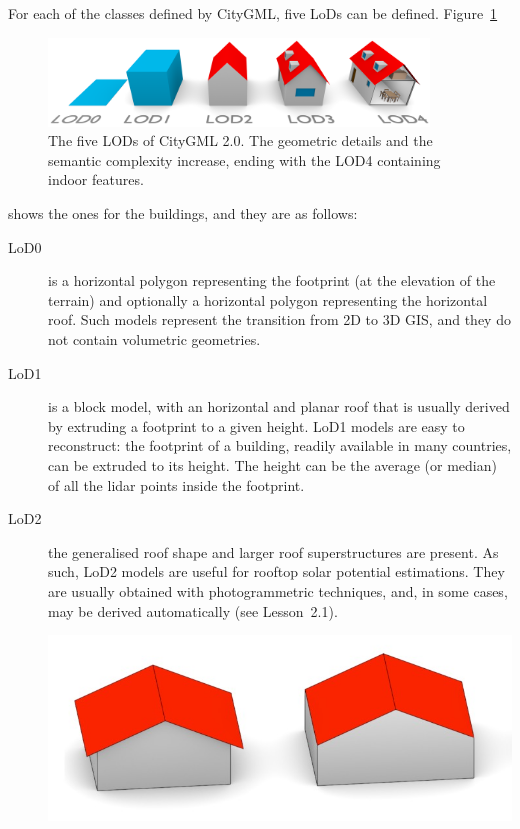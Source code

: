 For each of the classes defined by CityGML, five LoDs can be defined.
Figure~\ref{fig:officiallods}
\begin{figure}[h]
  \centering
  \includegraphics[width=0.9\textwidth]{figs/CityGML-LODs-c3.png}
  \caption{The five LODs of CityGML 2.0. The geometric details and the semantic complexity increase, ending with the LOD4 containing indoor features.}%
\label{fig:officiallods}
\end{figure}
shows the ones for the buildings, and they are as follows:
\begin{description}
  \item[LoD0] is a horizontal polygon representing the footprint (at the elevation of the terrain) and optionally a horizontal polygon representing the horizontal roof.
  Such models represent the transition from 2D to 3D GIS, and they do not contain volumetric geometries.
  \item[LoD1] is a block model, with an horizontal and planar roof that is usually derived by extruding a footprint to a given height.
  LoD1 models are easy to reconstruct: the footprint of a building, readily available in many countries, can be extruded to its height. The height can be the average (or median) of all the lidar points inside the footprint.
  \item[LoD2] the generalised roof shape and larger roof superstructures are present.
  As such, LoD2 models are useful for rooftop solar potential estimations.
  They are usually obtained with photogrammetric techniques, and, in some cases, may be derived automatically (see Lesson~2.1). 
  \begin{marginfigure}
    \centering
    \includegraphics[width=\linewidth]{figs/lod_ambiguity_b}

\end{marginfigure}
\end{description}
